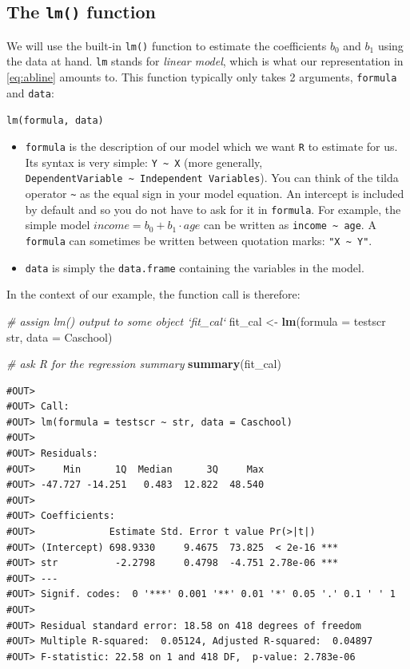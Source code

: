 \documentclass[]{book}
\newenvironment{Shaded}{\begin{snugshade}}{\end{snugshade}}
\newcommand{\KeywordTok}[1]{\textcolor[rgb]{0.13,0.29,0.53}{\textbf{#1}}}
\newcommand{\DataTypeTok}[1]{\textcolor[rgb]{0.13,0.29,0.53}{#1}}
\newcommand{\StringTok}[1]{\textcolor[rgb]{0.31,0.60,0.02}{#1}}
\newcommand{\CommentTok}[1]{\textcolor[rgb]{0.56,0.35,0.01}{\textit{#1}}}
\newcommand{\OperatorTok}[1]{\textcolor[rgb]{0.81,0.36,0.00}{\textbf{#1}}}
\newcommand{\NormalTok}[1]{#1}
\theoremstyle{definition}
\theoremstyle{definition}
\theoremstyle{definition}
\theoremstyle{remark}
\begin{document}
\subsection{\texorpdfstring{The \texttt{lm()}
function}{The lm() function}}\label{the-lm-function}

We will use the built-in \texttt{lm()} function to estimate the
coefficients \(b_0\) and \(b_1\) using the data at hand. \texttt{lm}
stands for \emph{linear model}, which is what our representation in
\eqref{eq:abline} amounts to. This function typically only takes 2
arguments, \texttt{formula} and \texttt{data}:

\texttt{lm(formula,\ data)}

\begin{itemize}
\item
  \texttt{formula} is the description of our model which we want
  \texttt{R} to estimate for us. Its syntax is very simple:
  \texttt{Y\ \textasciitilde{}\ X} (more generally,
  \texttt{DependentVariable\ \textasciitilde{}\ Independent\ Variables}).
  You can think of the tilda operator \texttt{\textasciitilde{}} as the
  equal sign in your model equation. An intercept is included by default
  and so you do not have to ask for it in \texttt{formula}. For example,
  the simple model \(income = b_0 + b_1 \cdot age\) can be written as
  \texttt{income\ \textasciitilde{}\ age}. A \texttt{formula} can
  sometimes be written between quotation marks:
  \texttt{"X\ \textasciitilde{}\ Y"}.
\item
  \texttt{data} is simply the \texttt{data.frame} containing the
  variables in the model.
\end{itemize}

In the context of our example, the function call is therefore:

\begin{Shaded}
\begin{Highlighting}[]
\CommentTok{# assign lm() output to some object `fit_cal`}
\NormalTok{fit_cal <-}\StringTok{ }\KeywordTok{lm}\NormalTok{(}\DataTypeTok{formula =}\NormalTok{ testscr }\OperatorTok{~}\StringTok{ }\NormalTok{str, }\DataTypeTok{data =}\NormalTok{ Caschool)}

\CommentTok{# ask R for the regression summary}
\KeywordTok{summary}\NormalTok{(fit_cal) }
\end{Highlighting}
\end{Shaded}

\begin{verbatim}
#OUT> 
#OUT> Call:
#OUT> lm(formula = testscr ~ str, data = Caschool)
#OUT> 
#OUT> Residuals:
#OUT>     Min      1Q  Median      3Q     Max 
#OUT> -47.727 -14.251   0.483  12.822  48.540 
#OUT> 
#OUT> Coefficients:
#OUT>             Estimate Std. Error t value Pr(>|t|)    
#OUT> (Intercept) 698.9330     9.4675  73.825  < 2e-16 ***
#OUT> str          -2.2798     0.4798  -4.751 2.78e-06 ***
#OUT> ---
#OUT> Signif. codes:  0 '***' 0.001 '**' 0.01 '*' 0.05 '.' 0.1 ' ' 1
#OUT> 
#OUT> Residual standard error: 18.58 on 418 degrees of freedom
#OUT> Multiple R-squared:  0.05124, Adjusted R-squared:  0.04897 
#OUT> F-statistic: 22.58 on 1 and 418 DF,  p-value: 2.783e-06
\end{verbatim}
\end{document}

